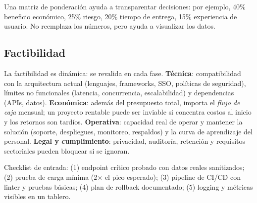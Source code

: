 \documentclass[12pt]{article}
\begin{document}
Una matriz de ponderación ayuda a transparentar decisiones: por ejemplo, 40\% beneficio económico, 25\% riesgo, 20\% tiempo de entrega, 15\% experiencia de usuario. No reemplaza los números, pero ayuda a visualizar los datos.

\subsection{Factibilidad}
La factibilidad es dinámica: se revalida en cada fase. 
\textbf{Técnica}: compatibilidad con la arquitectura actual (lenguajes, frameworks, SSO, políticas de seguridad), límites no funcionales (latencia, concurrencia, escalabilidad) y dependencias (APIs, datos). 
\textbf{Económica}: además del presupuesto total, importa el \textit{flujo de caja} mensual; un proyecto rentable puede ser inviable si concentra costos al inicio y los retornos son tardíos. 
\textbf{Operativa}: capacidad real de operar y mantener la solución (soporte, despliegues, monitoreo, respaldos) y la curva de aprendizaje del personal. 
\textbf{Legal y cumplimiento}: privacidad, auditoría, retención y requisitos sectoriales pueden bloquear si se ignoran. 

Checklist de entrada: (1) endpoint crítico probado con datos reales sanitizados; (2) prueba de carga mínima (2$\times$ el pico esperado); (3) pipeline de CI/CD con linter y pruebas básicas; (4) plan de rollback documentado; (5) logging y métricas visibles en un tablero.
\end{document}
